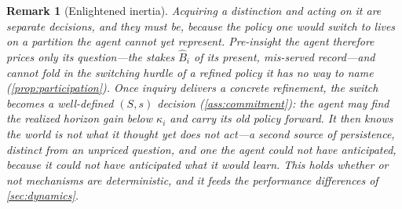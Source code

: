 \documentclass[11pt]{article}
\newtheorem{remark}[assumption]{Remark}
\theoremstyle{definition}
\begin{document}
\begin{remark}[Enlightened inertia]
\label{rem:stickiness}
Acquiring a distinction and acting on it are separate decisions, and they must be, because the policy one would switch to lives on a partition the agent cannot yet represent.
Pre-insight the agent therefore prices only its question---the stakes $\widehat B_i$ of its present, mis-served record---and cannot fold in the switching hurdle of a refined policy it has no way to name (\cref{prop:participation}).
Once inquiry delivers a concrete refinement, the switch becomes a well-defined $(S,s)$ decision (\cref{ass:commitment}): the agent may find the realized horizon gain below $\kappa_i$ and carry its old policy forward.
It then knows the world is not what it thought yet does not act---a second source of persistence, distinct from an unpriced question, and one the agent could not have anticipated, because it could not have anticipated what it would learn.
This holds whether or not mechanisms are deterministic, and it feeds the performance differences of \cref{sec:dynamics}.
\end{remark}
\end{document}
